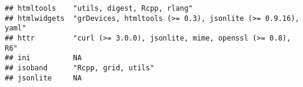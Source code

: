 \documentclass[]{book}
\begin{document}
\begin{verbatim}
## htmltools    "utils, digest, Rcpp, rlang"                                                                                                                                                                                                                                                                                                                                                                                                                                                                                
## htmlwidgets  "grDevices, htmltools (>= 0.3), jsonlite (>= 0.9.16), yaml"                                                                                                                                                                                                                                                                                                                                                                                                                                                 
## httr         "curl (>= 3.0.0), jsonlite, mime, openssl (>= 0.8), R6"                                                                                                                                                                                                                                                                                                                                                                                                                                                     
## ini          NA                                                                                                                                                                                                                                                                                                                                                                                                                                                                                                          
## isoband      "Rcpp, grid, utils"                                                                                                                                                                                                                                                                                                                                                                                                                                                                                         
## jsonlite     NA                                                                                                                                                                                                                                                                                                                                                                                                                                                                                                          

\end{verbatim}
\end{document}
